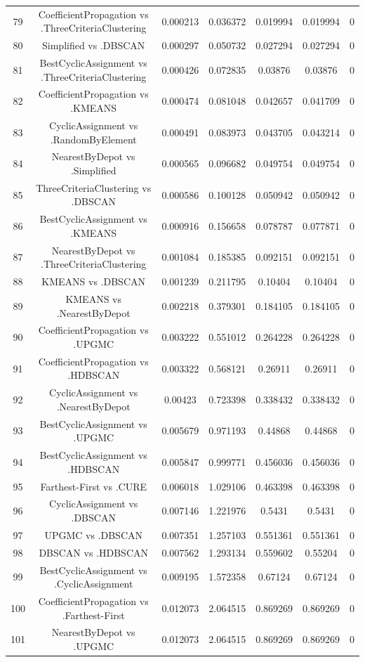 \documentclass[a4paper,10pt]{article}
\begin{document}
\begin{landscape}
\begin{table}[!htp]
\begin{tabular}{ccccccc}
79&CoefficientPropagation vs .ThreeCriteriaClustering&0.000213&0.036372&0.019994&0.019994&0\\
80&Simplified vs .DBSCAN&0.000297&0.050732&0.027294&0.027294&0\\
81&BestCyclicAssignment vs .ThreeCriteriaClustering&0.000426&0.072835&0.03876&0.03876&0\\
82&CoefficientPropagation vs .KMEANS&0.000474&0.081048&0.042657&0.041709&0\\
83&CyclicAssignment vs .RandomByElement&0.000491&0.083973&0.043705&0.043214&0\\
84&NearestByDepot vs .Simplified&0.000565&0.096682&0.049754&0.049754&0\\
85&ThreeCriteriaClustering vs .DBSCAN&0.000586&0.100128&0.050942&0.050942&0\\
86&BestCyclicAssignment vs .KMEANS&0.000916&0.156658&0.078787&0.077871&0\\
87&NearestByDepot vs .ThreeCriteriaClustering&0.001084&0.185385&0.092151&0.092151&0\\
88&KMEANS vs .DBSCAN&0.001239&0.211795&0.10404&0.10404&0\\
89&KMEANS vs .NearestByDepot&0.002218&0.379301&0.184105&0.184105&0\\
90&CoefficientPropagation vs .UPGMC&0.003222&0.551012&0.264228&0.264228&0\\
91&CoefficientPropagation vs .HDBSCAN&0.003322&0.568121&0.26911&0.26911&0\\
92&CyclicAssignment vs .NearestByDepot&0.00423&0.723398&0.338432&0.338432&0\\
93&BestCyclicAssignment vs .UPGMC&0.005679&0.971193&0.44868&0.44868&0\\
94&BestCyclicAssignment vs .HDBSCAN&0.005847&0.999771&0.456036&0.456036&0\\
95&Farthest-First vs .CURE&0.006018&1.029106&0.463398&0.463398&0\\
96&CyclicAssignment vs .DBSCAN&0.007146&1.221976&0.5431&0.5431&0\\
97&UPGMC vs .DBSCAN&0.007351&1.257103&0.551361&0.551361&0\\
98&DBSCAN vs .HDBSCAN&0.007562&1.293134&0.559602&0.55204&0\\
99&BestCyclicAssignment vs .CyclicAssignment&0.009195&1.572358&0.67124&0.67124&0\\
100&CoefficientPropagation vs .Farthest-First&0.012073&2.064515&0.869269&0.869269&0\\
101&NearestByDepot vs .UPGMC&0.012073&2.064515&0.869269&0.869269&0\\

\end{tabular}
\end{table}
\end{landscape}
\end{document}
